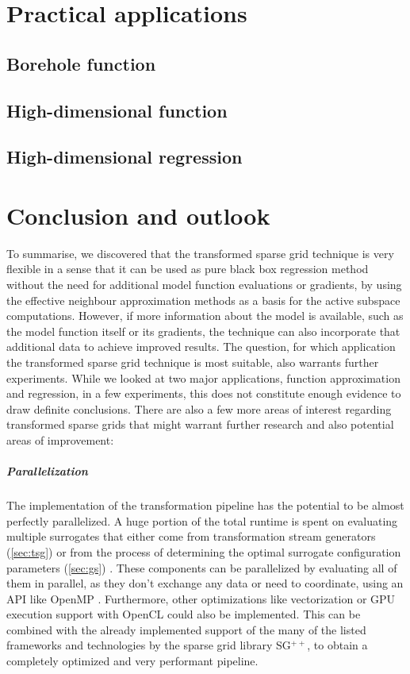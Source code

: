 \documentclass[
  a4paper,  %
  twoside,  %
  bibliography=totoc,
  headsepline,
  cleardoublepage=empty,
  parskip=half,
  draft=false
]{scrbook}
\begin{document}
\chapter{Practical applications}
\label{chap:c8}

\section{Borehole function}
\section{High-dimensional function}
\section{High-dimensional regression}

\chapter{Conclusion and outlook}
\label{chap:c9}

To summarise, we discovered that the transformed sparse grid technique is very flexible in a sense that it can be used as pure black box regression method without the need for additional model function evaluations or gradients, by using the effective neighbour approximation methods as a basis for the active subspace computations.
However, if more information about the model is available, such as the model function itself or its gradients, the technique can also incorporate that additional data to achieve improved results.
The question, for which application the transformed sparse grid technique is most suitable, also warrants further experiments.
While we looked at two major applications, function approximation and regression, in a few experiments, this does not constitute enough evidence to draw definite conclusions.
There are also a few more areas of interest regarding transformed sparse grids that might warrant further research and also potential areas of improvement:

\paragraph{Parallelization}
The implementation of the transformation pipeline has the potential to be almost perfectly parallelized.
A huge portion of the total runtime is spent on evaluating multiple surrogates that either come from transformation stream generators (\cref{sec:tsg}) or from the process of determining the optimal surrogate configuration parameters (\cref{sec:gs}) .
These components can be parallelized by evaluating all of them in parallel, as they don't exchange any data or need to coordinate, using an API like OpenMP \cite{openmp08}.
Furthermore, other optimizations like vectorization \cite{Maleki2011} or GPU execution support with OpenCL \cite{Stone2010} could also be implemented.
This can be combined with the already implemented support of the many of the listed frameworks and technologies by the sparse grid library SG$^{++}$, to obtain a completely optimized and very performant pipeline.
\end{document}
